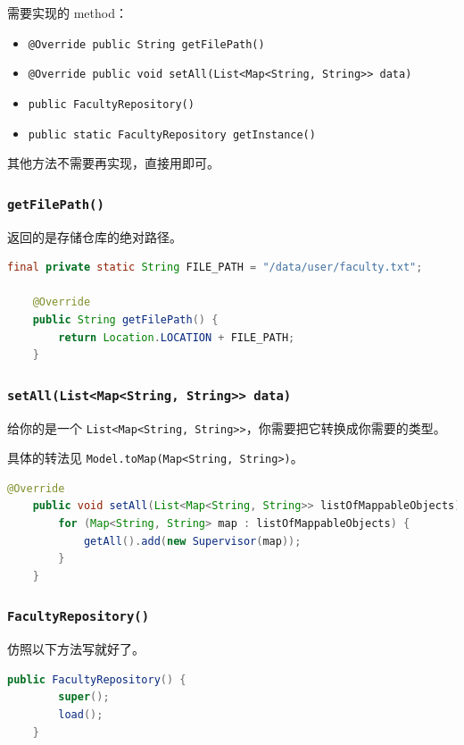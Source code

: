 \documentclass[hyperref,UTF8,12pt,a4paper]{ctexart}
\begin{document}
需要实现的 method：

\begin{itemize}
	\item \texttt{@Override public String getFilePath()}
	\item \texttt{@Override public void setAll(List<Map<String, String>> data)}
	\item \texttt{public FacultyRepository()}
	\item \texttt{public static FacultyRepository getInstance()}
\end{itemize}

其他方法不需要再实现，直接用即可。

\subsubsection{\texttt{getFilePath()}}

返回的是存储仓库的绝对路径。

\begin{lstlisting}[language=Java]
    final private static String FILE_PATH = "/data/user/faculty.txt";

    @Override
    public String getFilePath() {
        return Location.LOCATION + FILE_PATH;
    }
\end{lstlisting}

\subsubsection{\texttt{setAll(List<Map<String, String>> data)}}

给你的是一个 \texttt{List<Map<String, String>>}，你需要把它转换成你需要的类型。

具体的转法见 \texttt{Model.toMap(Map<String, String>)}。

\begin{lstlisting}[language=Java]
    @Override
    public void setAll(List<Map<String, String>> listOfMappableObjects) {
        for (Map<String, String> map : listOfMappableObjects) {
            getAll().add(new Supervisor(map));
        }
    }
\end{lstlisting}

\subsubsection{\texttt{FacultyRepository()}}

仿照以下方法写就好了。

\begin{lstlisting}[language=Java]
	public FacultyRepository() {
		super();
		load();
	}
\end{lstlisting}
\end{document}
